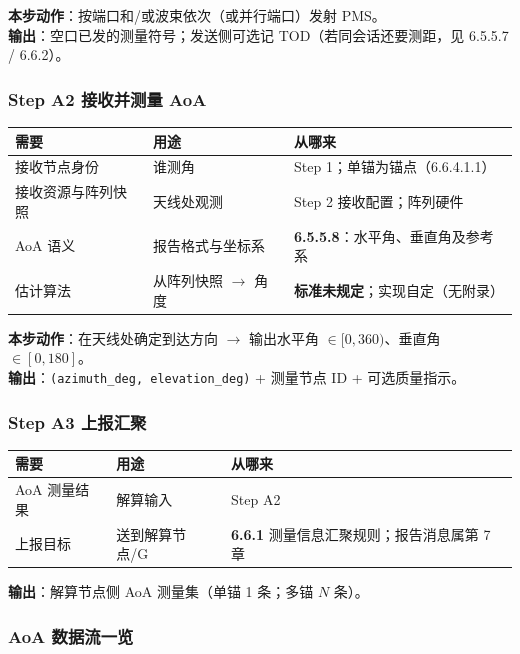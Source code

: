 \documentclass[11pt,a4paper]{ctexart}
\begin{document}
\textbf{本步动作}：按端口和/或波束依次（或并行端口）发射 PMS。\\
\textbf{输出}：空口已发的测量符号；发送侧可选记 TOD（若同会话还要测距，见 6.5.5.7 / 6.6.2）。

\subsubsection{Step A2 接收并测量 AoA}

\begin{table}[h]
\centering
\small
\begin{tabular}{L{3.2cm}L{5.0cm}L{4.8cm}}
\toprule
\textbf{需要} & \textbf{用途} & \textbf{从哪来} \\
\midrule
接收节点身份 & 谁测角 & Step 1；单锚为锚点（6.6.4.1.1） \\
接收资源与阵列快照 & 天线处观测 & Step 2 接收配置；阵列硬件 \\
AoA 语义 & 报告格式与坐标系 & \textbf{6.5.5.8}：水平角、垂直角及参考系 \\
估计算法 & 从阵列快照 $\rightarrow$ 角度 & \textbf{标准未规定}；实现自定（无附录） \\
\bottomrule
\end{tabular}
\end{table}

\textbf{本步动作}：在天线处确定到达方向 $\rightarrow$ 输出水平角 $\in[0,360)$、垂直角 $\in[0,180]$。\\
\textbf{输出}：\texttt{(azimuth\_deg, elevation\_deg)} + 测量节点 ID + 可选质量指示。

\subsubsection{Step A3 上报汇聚}

\begin{table}[h]
\centering
\small
\begin{tabular}{L{3.2cm}L{5.0cm}L{4.8cm}}
\toprule
\textbf{需要} & \textbf{用途} & \textbf{从哪来} \\
\midrule
AoA 测量结果 & 解算输入 & Step A2 \\
上报目标 & 送到解算节点/G & \textbf{6.6.1} 测量信息汇聚规则；报告消息属第 7 章 \\
\bottomrule
\end{tabular}
\end{table}

\textbf{输出}：解算节点侧 AoA 测量集（单锚 1 条；多锚 $N$ 条）。

\subsubsection{AoA 数据流一览}
\end{document}
